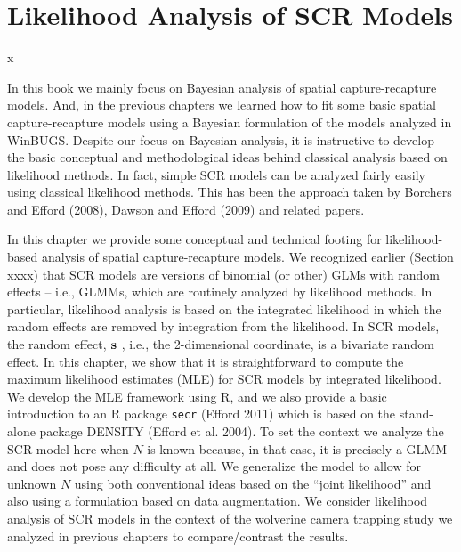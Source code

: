 \chapter{
Likelihood Analysis of SCR Models
}
\label{chapt.closed}



\vspace{.3in}
x


In this book we mainly focus on Bayesian analysis of spatial
capture-recapture models. And, in the previous chapters we learned how
to fit some basic spatial capture-recapture models using a Bayesian
formulation of the models analyzed in WinBUGS.  Despite our focus on
Bayesian analysis, it is instructive to develop the basic conceptual
and methodological ideas behind classical analysis based on likelihood
methods. In fact, simple SCR models can be analyzed fairly easily
using classical likelihood methods. This has been the approach taken
by Borchers and Efford (2008), Dawson and Efford (2009) and related
papers.

In this chapter we provide some conceptual and technical footing for
likelihood-based analysis of spatial capture-recapture models. We
recognized earlier (Section xxxx) that SCR models are versions of
binomial (or other) GLMs with random effects – i.e., GLMMs, which are
routinely analyzed by likelihood methods. In particular, likelihood
analysis is based on the integrated likelihood in which the random
effects are removed by integration from the likelihood. In SCR models,
the random effect, ${\bf s}$ , i.e., the 2-dimensional coordinate, is a
bivariate random effect. In this chapter, we show that it is
straightforward to compute the maximum likelihood estimates (MLE) for
SCR models by integrated likelihood. We develop the MLE framework
using R, and we also provide a basic introduction to an R package
\mbox{\tt secr} (Efford 2011) which is based on the stand-alone package DENSITY
(Efford et al. 2004).  To set the context we analyze the SCR model
here when $N$ is known because, in that case, it is precisely a GLMM and
does not pose any difficulty at all. We generalize the model to allow
for unknown $N$ using both conventional ideas based on the ``joint
likelihood'' \citep[e.g.,][]{borchers_etal:2002}
and also using a formulation
based on data augmentation.  We consider likelihood analysis of SCR
models in the context of the wolverine camera trapping study \citep{magoun_etal:2011}
 we analyzed in previous chapters to compare/contrast the
results.

